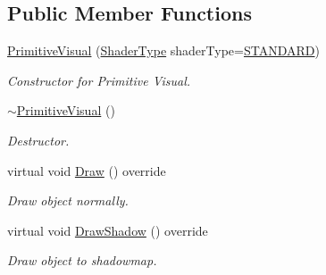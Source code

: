 \subsection*{Public Member Functions}
\begin{DoxyCompactItemize}
\item 
\mbox{\hyperlink{class_primitive_visual_a8198e82c2dc99af36b96a2ad35ec36aa}{Primitive\+Visual}} (\mbox{\hyperlink{_game_object_8h_a6230e1b9ecbf2d82d10856fd7e1fde46}{Shader\+Type}} shader\+Type=\mbox{\hyperlink{_texture_8h_a65468556d79304b3a4bfc464cc12e549a94e94133f4bdc1794c6b647b8ea134d0}{S\+T\+A\+N\+D\+A\+RD}})
\begin{DoxyCompactList}\small\item\em Constructor for Primitive Visual. \end{DoxyCompactList}\item 
\mbox{\hyperlink{class_primitive_visual_a2d1ca03da960111c6cce0852e02b10f6}{$\sim$\+Primitive\+Visual}} ()
\begin{DoxyCompactList}\small\item\em Destructor. \end{DoxyCompactList}\item 
virtual void \mbox{\hyperlink{class_primitive_visual_a9ce21acf4bb9b9d9ac24c75f6aa9aec3}{Draw}} () override
\begin{DoxyCompactList}\small\item\em Draw object normally. \end{DoxyCompactList}\item 
virtual void \mbox{\hyperlink{class_primitive_visual_a67915de082572ca4f6467c1402587024}{Draw\+Shadow}} () override
\begin{DoxyCompactList}\small\item\em Draw object to shadowmap. \end{DoxyCompactList}\end{DoxyCompactItemize}
